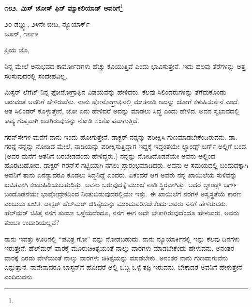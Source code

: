 \begin{center}
\textbf{೧೮೨. ಮಿಸ್ ಜೋಸ್ ಫಿನ್ ಮ್ಯಾಕಲಿಯಾಡ್ ಅವರಿಗೆ}\footnote{}
\end{center}

\vspace{-0.5cm}

\begin{flushright}
೨೦ ಡಬ್ಲ್ಯು, ೨೪ನೇ ಬೀದಿ, ನ್ಯೂಯಾರ್ಕ್\\ಜೂನ್, ೧೮೯೫
\end{flushright}

\vspace{-0.3cm}

\noindent
ಪ್ರಿಯ ಜೊ,

ನಿನ್ನ ಮೇಲೆ ಅನುಭವದ ಕಾರ್ಮೋಡಗಳು ಹೆಚ್ಚು ಕವಿಯುತ್ತಿವೆ ಎಂದು ಭಾವಿಸುತ್ತೇನೆ. ಇದು ಹಲವು ತೆರೆಗಳನ್ನು ಅತ್ತ ಸರಿಸುವುದರಲ್ಲಿ ಸಂದೇಹವಿಲ್ಲ.

ಮಿಸ್ಟರ್ ಲೆಗೆಟ್ ನಿನ್ನ ಫೋನೋಗ್ರಾಫಿನ ವಿಷಯವನ್ನು ಹೇಳಿದರು. ಕೆಲವು ಸಿಲಿಂಡರುಗಳನ್ನು ತೆಗೆದುಕೊಂಡು ಬರುವಂತೆ ಅವರಿಗೆ ಹೇಳಿರುವೆನು. ನಾನು ಫೋನೋಗ್ರಾಫಿನಲ್ಲಿ ಮಾತನಾಡಿ ಅದನ್ನು ಜೋಗೆ ಕಳುಹಿಸುತ್ತೇನೆ ಎಂದೆ. ಆತ ಸಿಲಿಂಡರ್‌ ಕೊಳ್ಳುತ್ತೇನೆ, ಜೋ ಏನು ಹೇಳಿದರೆ ಅದನ್ನು ಮಾಡಲು ಸಿದ್ಧ ಎಂದು ಹೇಳಿದ. ಅವನ ಸ್ವಭಾವದಲ್ಲಿ ಕಾವ್ಯ ಗುಪ್ತವಾಗಿ ಅಡಗಿರುವುದನ್ನು ನೋಡಿ ಸಂತೋಷವಾಗುತ್ತಿದೆ.

ಗರನ್‌ಸೇಗಳ ಮನೆಗೆ ನಾನು ಇಂದು ಹೋಗುತ್ತೇನೆ. ಡಾಕ್ಟರ್ ನನ್ನನ್ನು ಪರೀಕ್ಷಿಸಿ ಗುಣಮಾಡಬೇಕೆಂದಿರುವನು. ಡಾ. ಗರನ್ಸೆ ನನ್ನನ್ನು ನೋಡಿದ ಮೇಲೆ, ನಾಡಿಯನ್ನು ಪರೀಕ್ಷಿಸುತ್ತಿದ್ದಾಗ ಇದ್ದಕ್ಕೆ ಇದ್ದಂತೆಯೇ ಲ್ಯಾಂಡ್ಸ್ ಬರ್ಗ್ ಅಲ್ಲಿಗೆ ಬಂದ. (ಅವರ ಮನೆಗೆ ಆತನಿಗೆ ಬರಬೇಡವೆಂದು ಹೇಳಿದ್ದರು.) ನನ್ನನ್ನು ನೋಡಿದೊಡನೆಯೇ ಅವನು ಅಲ್ಲಿಂದ ಹೊರಟುಹೋದ. ಡಾಕ್ಟರ್‌ ಗರನ್‌ಸೆ ಗಟ್ಟಿಯಾಗಿ ನಗಲು ಪ್ರಾರಂಭಮಾಡಿದರು. ಅವನು ಆ ಸಮಯದಲ್ಲಿ ಬಂದುದಕ್ಕಾಗಿ ಅವನಿಗೆ ತಾನು ಏನನ್ನಾದರೂ ಕೊಡಲು ಸಿದ್ಧನಿದ್ದೆ ಎಂದರು. ಏಕೆಂದರೆ ಆಗ ಅವರು ನನ್ನ ಖಾಯಿಲೆಯ ಸುಳಿವನ್ನು ಖಚಿತವಾಗಿ ಕಂಡುಹಿಡಿಯಬಹುದಿತ್ತು. ಅವನು ಬರುವುದಕ್ಕೆ ಮುಂಚೆ ನಾಡಿ ಸ್ಥಿರವಾಗಿತ್ತು. ಆದರೆ ಲ್ಯಾಂಡ್ಸ್ ಬರ್ಗ್ ಬಂದೊಡನೆಯೇ ಭಾವೋದ್ರೇಕದಿಂದ ನಿಂತುಬಿಡುವುದರಲ್ಲಿಯೇ ಇತ್ತು. ಈ ಖಾಯಿಲೆಗೆ ನರಗಳ ಅಸ್ವಸ್ಥತೆಯೆ  ಕಾರಣ ಎಂಬುದು ಖಚಿತ. ಡಾಕ್ಟರ್ ಹೆಲ್‌ಮರ್‌ ಚಿಕಿತ್ಸೆಯನ್ನು ಮುಂದುವರಿಸಬೇಕೆಂದು ಅವರು ನನಗೆ ಹೇಳಿರುವರು. ಹೆಲ್‌ಮರ್‌ ಚಿಕಿತ್ಸೆ ನನಗೆ ತುಂಬಾ ಒಳ್ಳೆಯದೆಂದೂ, ನನಗೆ ಈಗ ಅದೇ ಬೇಕಾಗಿರುವುದೆಂದೂ ಹೇಳುವರು. ಅವರು ತುಂಬಾ ಉದಾರಿಯಲ್ಲವೆ?

ನಾನು ಇವತ್ತು ಊರಿನಲ್ಲಿ “ಪವಿತ್ರ ಗೋ” ವನ್ನು ನೋಡಬಹುದು. ನಾನು ನ್ಯೂಯಾರ್ಕಿನಲ್ಲಿ ಇನ್ನು ಕೆಲವು ದಿನಗಳು ಇರುತ್ತೇನೆ. ಹೆಲ್‌ಮ‌ರ್ ವಾರಕ್ಕೆ ಮೂರು\break ಚಿಕಿತ್ಸೆಯಂತೆ ನಾಲ್ಕು ವಾರಗಳು ಮಾಡಬೇಕೆಂದು ಹೇಳುವನು. ಅನಂತರ ವಾರಕ್ಕೆ ಎರಡು ವೇಳೆಯಂತೆ ನಾಲ್ಕು ವಾರಗಳು ಚಿಕಿತ್ಸೆಯನ್ನು ಮಾಡಬೇಕು. ಅನಂತರ ನಾನು ಗುಣವಾಗುವೆನು ಎನ್ನುತ್ತಾನೆ. ನಾನೇನಾದರೂ ಬಾಸ್ಟನ್‌ಗೆ ಹೋದರೆ ಅಲ್ಲಿ ಒಬ್ಬ ಒಳ್ಳೆ ತಜ್ಞ  ಇರುವನು, ಬೇಕಾದರೆ ಅವನಿಗೆ ಹೇಳುತ್ತೇನೆ ಎಂದಿರುವನು.

\vspace{0.1cm}

